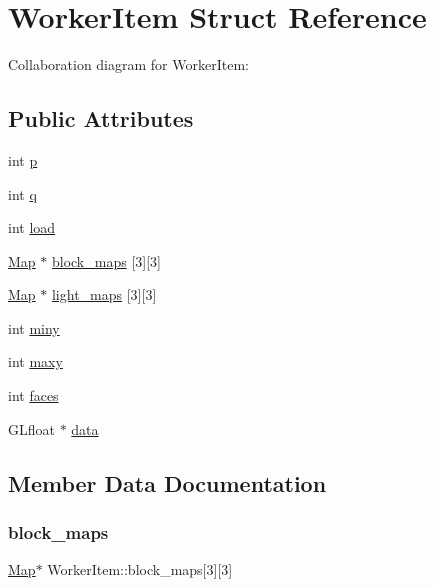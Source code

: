 \hypertarget{structWorkerItem}{}\section{Worker\+Item Struct Reference}
\label{structWorkerItem}


Collaboration diagram for Worker\+Item\+:
\subsection*{Public Attributes}
\begin{DoxyCompactItemize}
\item 
int \hyperlink{structWorkerItem_a56f8195e12033bf669e3543ac37035bf}{p}
\item 
int \hyperlink{structWorkerItem_aca226a9caa91a2d8d8705681767607b2}{q}
\item 
int \hyperlink{structWorkerItem_a82cdbfb0c2a6f0de3fd05a514da724d5}{load}
\item 
\hyperlink{structMap}{Map} $\ast$ \hyperlink{structWorkerItem_a01e7ce1680490053e0fd7816ee9ceb04}{block\+\_\+maps} \mbox{[}3\mbox{]}\mbox{[}3\mbox{]}
\item 
\hyperlink{structMap}{Map} $\ast$ \hyperlink{structWorkerItem_ac7e3900b71b86f43e953e69c5f64dc51}{light\+\_\+maps} \mbox{[}3\mbox{]}\mbox{[}3\mbox{]}
\item 
int \hyperlink{structWorkerItem_a368c07bd7512c33c2af234b01feb2000}{miny}
\item 
int \hyperlink{structWorkerItem_a230160dce9a2c4bfdbfe56491a7734a1}{maxy}
\item 
int \hyperlink{structWorkerItem_a4ba610cef58e6b92862a44796ae63a50}{faces}
\item 
G\+Lfloat $\ast$ \hyperlink{structWorkerItem_af30032f39cbd48ca5bb7cc09deab7d1b}{data}
\end{DoxyCompactItemize}


\subsection{Member Data Documentation}
\mbox{\label{structWorkerItem_a01e7ce1680490053e0fd7816ee9ceb04}} 
\subsubsection{\texorpdfstring{block\+\_\+maps}{block\_maps}}
{\footnotesize\ttfamily \hyperlink{structMap}{Map}$\ast$ Worker\+Item\+::block\+\_\+maps\mbox{[}3\mbox{]}\mbox{[}3\mbox{]}}

